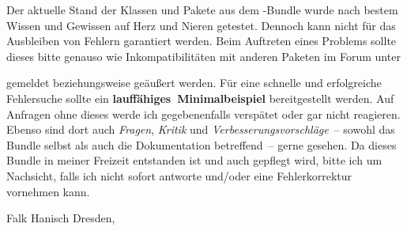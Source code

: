 Der aktuelle Stand der Klassen und Pakete aus dem \TUDScript-Bundle wurde nach 
bestem Wissen und Gewissen auf Herz und Nieren getestet. Dennoch kann nicht für 
das Ausbleiben von Fehlern garantiert werden. Beim Auftreten eines Problems 
sollte dieses bitte genauso wie Inkompatibilitäten mit anderen Paketen im Forum 
unter
\begin{quote}
\Forum*%
\end{quote}
gemeldet beziehungsweise geäußert werden. Für eine schnelle und erfolgreiche 
Fehlersuche sollte ein  
{\textbf{lauffähiges~Minimalbeispiel}} bereitgestellt werden. Auf Anfragen ohne 
dieses werde ich gegebenenfalls verspätet oder gar nicht reagieren. Ebenso sind 
dort auch \emph{Fragen}, \emph{Kritik} und \emph{Verbesserungsvorschläge}~-- 
sowohl das Bundle selbst als auch die Dokumentation betreffend~-- gerne 
gesehen. Da dieses Bundle in meiner Freizeit entstanden ist und auch gepflegt 
wird, bitte ich um Nachsicht, falls ich nicht sofort antworte und/oder eine 
Fehlerkorrektur vornehmen kann.

\makeatletter
\bigskip
\noindent Falk Hanisch\newline
Dresden, \@date
\makeatother